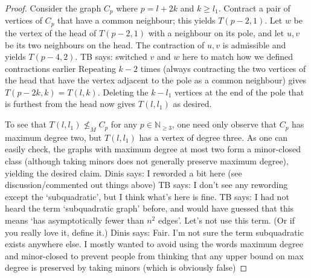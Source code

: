 \documentclass[a4paper,preprint,12pt]{elsarticle}
\newcommand{\therese}[1]{{\color{brown} TB says: #1}}
\newcommand{\dinis}[1]{{\color{blue} Dinis says: #1}}
\newcommand{\therese}[1]{}
\newcommand{\dinis}[1]{}
\newcommand{\minorOf}{\leq_{M}}
\newcommand{\IN}{\mathbb{N}}
\begin{document}
\begin{proof}
    Consider the graph $C_p$ where $p=l+2k$ and $k\geq l_1$.
    Contract a pair of vertices of $C_p$ that have a common neighbour;
    this yields $T(p-2,1)$.
    Let $w$ be the vertex of the head of $T(p-2,1)$ with a neighbour on its pole, and let $u,v$ be its two neighbours on the head.
    The contraction of $u,v$ is admissible and yields $T(p-4,2)$.
    \therese{switched $v$ and $w$ here to match how we defined contractions earlier}
    Repeating $k-2$ times (always contracting the two vertices of the head that have the vertex adjacent to the pole as a common neighbour) gives $T(p-2k,k)=T(l,k)$.
    Deleting the $k-l_1$ vertices at the end of the pole that is furthest from the head now gives $T(l,l_1)$ as desired.

    To see that $T(l,l_1)\not\minorOf C_{p}$ for any $p\in\IN_{\geq 3}$, one need only observe that $C_p$ has maximum degree two, but $T(l,l_1)$ has a vertex of degree three.
    As one can easily check, the graphs with maximum degree at most two form a minor-closed class (although taking minors does not generally preserve maximum degree), yielding the desired claim.
    \dinis{I reworded a bit here (see discussion/commented out things above)}
    \therese{I don't see any rewording except the `subquadratic', but I think what's here is fine.}
    \therese{I had not heard the term `subquadratic graph' before, and would have guessed that this means `has asymptotically fewer than $n^2$ edges'.  Let's not use this term.  (Or if you really love it, define it.)}
    \dinis{Fair.
    I'm not sure the term subquadratic exists anywhere else.
    I mostly wanted to avoid using the words maximum degree and minor-closed to prevent people from thinking that any upper bound on max degree is preserved by taking minors (which is obviously false)}
\end{proof}
\end{document}
